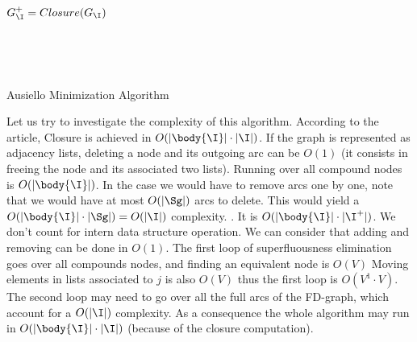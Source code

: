 \begin{algorithm}

\BlankLine
\BlankLine

$G_{\I}^{+} = Closure(G_{\I})$ \;

\BlankLine

 \\

\BlankLine

 \\


\caption{Ausiello Minimization Algorithm}
\label{alg:ausiello-min}
\end{algorithm}

\vspace{1.2em} 

Let us try to investigate the complexity of this algorithm. According to the 
article, Closure is achieved in $O(|\body{\I}| \cdot |\I|)$. If the graph is
represented as adjacency lists, deleting a node and its outgoing arc can be
$O(1)$ (it consists in freeing the node and its associated two lists). Running 
over all compound nodes is $O(|\body{\I}|)$. In the case we would have to 
remove arcs one by one, note that we would have at most $O(|\Sg|)$ arcs to 
delete. This would yield a $O(|\body{\I}| \cdot |\Sg|) = O(|\I|)$
complexity. . It is $O(|\body{\I}| \cdot 
|\I^{+}|)$. We don't count for intern data structure operation. We can consider
that adding and removing can be done in $O(1)$. The first loop of 
superfluousness elimination goes over all compounds nodes, and finding an 
equivalent node is $O(V)$ Moving elements in lists associated to $j$ is also
$O(V)$ thus the first loop is $O(V^1 \cdot V)$. The second loop may need to 
go over all the full arcs of the FD-graph, which account for a $O(|\I|)$ 
complexity. As a consequence the whole algorithm may run in $O(|\body{\I}| 
\cdot |\I|)$ (because of the closure computation).



